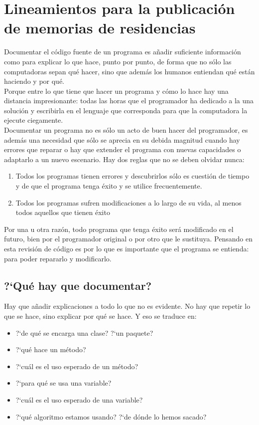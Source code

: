 \chapter{Lineamientos para la publicaci\'on de memorias de residencias}
Documentar el c\'odigo fuente de un programa es a\~nadir suficiente informaci\'on como para explicar lo que hace, punto por punto, de forma que no s\'olo las computadoras sepan qu\'e hacer, sino que adem\'as los humanos entiendan qu\'e est\'an haciendo y por qu\'e.\\

Porque entre lo que tiene que hacer un programa y c\'omo lo hace hay una distancia impresionante: todas las horas que el programador ha dedicado a la una soluci\'on y escribirla en el lenguaje que corresponda para que la computadora la ejecute ciegamente.\\

Documentar un programa no es s\'olo un acto de buen hacer del programador, es adem\'as una necesidad que s\'olo se aprecia en su debida magnitud cuando hay errores que reparar o hay que extender el programa con nuevas capacidades o adaptarlo a un nuevo escenario. Hay dos reglas que no se deben olvidar nunca:

\begin{enumerate}[1)]
	\item 	Todos los programas tienen errores y descubrirlos s\'olo es cuesti\'on de tiempo y de que el programa tenga \'exito y se utilice frecuentemente.

	\item Todos los programas sufren modificaciones a lo largo de su vida, al menos todos aquellos que tienen \'exito
\end{enumerate}

Por una u otra raz\'on, todo programa que tenga \'exito ser\'a modificado en el futuro, bien por el programador original o por otro que le sustituya. Pensando en esta revisi\'on de c\'odigo es por lo que es importante que el programa se entienda: para poder repararlo y modificarlo.

\section{?`Qu\'{e} hay que documentar?}

Hay que a\~nadir explicaciones a todo lo que no es evidente. No hay que repetir lo que se hace, sino explicar por qu\'e se hace.
Y eso se traduce en:

\begin{itemize}
	\item ?`de qu\'e se encarga una clase? ?`un paquete?
	\item ?`qu\'e hace un m\'etodo?
	\item ?`cu\'al es el uso esperado de un m\'etodo?
	\item ?`para qu\'e se usa una variable?
	\item ?`cu\'al es el uso esperado de una variable?
	\item ?`qu\'e algoritmo estamos usando? ?`de d\'onde lo hemos sacado?
\end{itemize}

